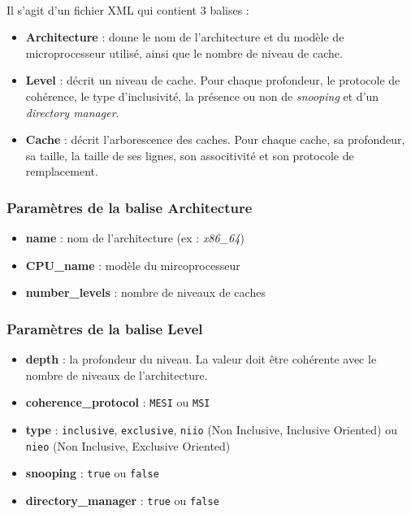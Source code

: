 \paragraph{}
Il s'agit d'un fichier XML qui contient 3 balises :
\begin{itemize}
  \item \textbf{Architecture} : donne le nom de l'architecture et du modèle de microprocesseur utilisé, ainsi que le nombre de niveau de cache.
  \item \textbf{Level} : décrit un niveau de cache. Pour chaque profondeur, le protocole de cohérence, le type d'inclusivité, la présence ou non de \textit{snooping} et d'un \textit{directory manager}.
  \item \textbf{Cache} : décrit l'arborescence des caches. Pour chaque cache, sa profondeur, sa taille, la taille de ses lignes, son associtivité et son protocole de remplacement.
\end{itemize}

\subsubsection{Paramètres de la balise Architecture}

\begin{itemize}
  \item \textbf{name} : nom de l'architecture (ex : \textit{x86\_64})
  \item \textbf{CPU\_name} : modèle du mircoprocesseur
  \item \textbf{number\_levels} : nombre de niveaux de caches
\end{itemize}

\subsubsection{Paramètres de la balise Level}

\begin{itemize}
  \item \textbf{depth} : la profondeur du niveau. La valeur doit être cohérente avec le nombre de niveaux de l'architecture.
  \item \textbf{coherence\_protocol} : \verb?MESI? ou \verb?MSI?
  \item \textbf{type} : \verb?inclusive?, \verb?exclusive?, \verb?niio? (Non Inclusive, Inclusive Oriented) ou \verb?nieo? (Non Inclusive, Exclusive Oriented)
  \item \textbf{snooping} : \verb?true? ou \verb?false?
  \item \textbf{directory\_manager} : \verb?true? ou \verb?false?
\end{itemize}

